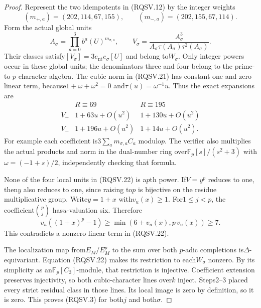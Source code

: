 \begin{proof}
Represent the two idempotents in (RQSV.12) by the integer weights
\[
 (m_{+,a})=(202,114,67,155),\qquad
 (m_{-,a})=(202,155,67,114).
 \tag{RQSV.20}
\]
Form the actual global units
\[
 A_\sigma=\prod_{a=0}^3 b^a(U)^{m_{\sigma,a}},\qquad
 V_\sigma=\frac{A_\sigma^3}
                {A_\sigma\tau(A_\sigma)\tau^2(A_\sigma)}.
 \tag{RQSV.21}
\]
Their classes satisfy$[V_\sigma]=3e_{\mathrm{nt}}e_\sigma[U]$
and belong to$W_\sigma$.  Only integer powers occur in these
global units; the denominators three and four belong to the
prime-to-$p$ character algebra.
The cubic norm in (RQSV.21) has constant one and zero linear term,
because$1+\omega+\omega^2=0$ and$\tau(u)=\omega^{-1}u$.
Thus the exact expansions are
\[
 \begin{array}{c|cc}
       &R\equiv69&R\equiv195\\ \hline
 V_+&1+63u+O(u^2)&1+130u+O(u^2)\\
 V_-&1+196u+O(u^2)&1+14u+O(u^2).
 \end{array}
 \tag{RQSV.22}
\]
For example each coefficient is$3\sum_a m_{\sigma,a}C_a$ modulo$p$.
The verifier also multiplies the actual products and norm in the
dual-number ring over$\mathbb F_p[s]/(s^2+3)$ with
$\omega=(-1+s)/2$, independently checking that formula.

None of the four local units in (RQSV.22) is a$p$th power.
If$V=y^p$ reduces to one, then$y$ also reduces to one, since
raising to$p$ is bijective on the residue multiplicative group.
Write$y=1+x$ with$v_u(x)\ge1$.
For$1\le j<p$, the coefficient$\binom pj$ has$u$-valuation six.
Therefore
\[
        v_u((1+x)^p-1)\ge
                  \min(6+v_u(x),p\,v_u(x))\ge7.
 \tag{RQSV.23}
\]
This contradicts a nonzero linear term in (RQSV.22).

The localization map from$E_M/E_M^p$ to the sum over both
$p$-adic completions is$\Delta$-equivariant.
Equation (RQSV.22) makes its restriction to each$W_\sigma$
nonzero.  By its simplicity as an$\mathbb F_p[C_3]$-module,
that restriction is injective.  Coefficient extension preserves
injectivity, so both cubic-character lines over$k$ inject.
Steps2--3 placed every strict residual class in those lines.
Its local image is zero by definition, so it is zero.
This proves (RQSV.3) for both$j$ and both$\sigma$.
\end{proof}


